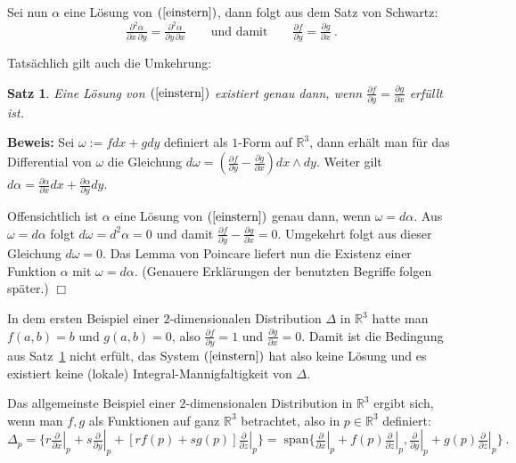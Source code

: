 \documentclass[12pt,a4paper]{article}
\def\R{\mathbb{R}}
\newtheorem{Satz}[Lemma]{Satz}
\def\proof{\noindent\textbf{Beweis:}\quad}
\def\qed{\quad\hfill\ensuremath{\Box}}
\begin{document}
Sei nun $\alpha$ eine L\"osung von $(\ref{einstern})$, dann folgt aus dem Satz von Schwartz:
$$
\tfrac{\partial^2 \alpha}{\partial x \, \partial y}
=
\tfrac{\partial^2 \alpha}{\partial y \, \partial x}
\qquad\mbox{und damit}\qquad
\tfrac{\partial f}{\partial y} = \tfrac{\partial g}{\partial x} \ .
$$

Tats\"achlich gilt auch die Umkehrung:

\begin{Satz}\label{bedingung1}
Eine L\"osung von $(\ref{einstern})$ existiert genau dann, wenn
 $\tfrac{\partial f}{\partial y} = \tfrac{\partial g}{\partial x}$ erf\"ullt ist.
\end{Satz}
\proof
Sei $\omega := f dx + g dy$ definiert als $1$-Form auf $\R^3$, dann erh\"alt man f\"ur das Differential von $\omega$
die Gleichung
$d\omega = (\tfrac{\partial f}{\partial y} - \tfrac{\partial g}{\partial x}) dx \wedge dy$. Weiter gilt
$d\alpha = \tfrac{\partial \alpha}{\partial x}dx + \tfrac{\partial \alpha}{\partial y}dy$.

\medskip

Offensichtlich ist
$\alpha$ eine L\"osung von $(\ref{einstern})$ genau dann, wenn $\omega = d\alpha$. Aus $\omega = d\alpha$ folgt
$d\omega = d^2\alpha = 0$ und damit $\tfrac{\partial f}{\partial y} - \tfrac{\partial g}{\partial x}=0$.
Umgekehrt folgt aus dieser Gleichung $d\omega=0$. Das Lemma von Poincare liefert nun die Existenz einer
Funktion $\alpha$ mit $\omega = d\alpha$.
(Genauere Erkl\"arungen der benutzten Begriffe folgen sp\"ater.)
\qed

\bigskip

In dem ersten Beispiel einer $2$-dimensionalen Distribution $\Delta$ in $\R^3$ hatte man
$f(a,b)=b$ und $g(a,b)=0$, also $\tfrac{\partial f}{\partial y}=1$ und $\tfrac{\partial g}{\partial x}=0$.
Damit ist die Bedingung aus Satz~\ref{bedingung1} nicht erf\"ult, das System $(\ref{einstern})$ hat also keine
L\"osung und es existiert keine (lokale) Integral-Mannigfaltigkeit von $\Delta$.

\bigskip

Das allgemeinste Beispiel einer $2$-dimensionalen Distribution in $\R^3$ ergibt sich, wenn man $f, g$ als Funktionen
 auf ganz $\R^3$ betrachtet, also in $p\in \R^3$ definiert:
$$
\Delta_p
=
\{
r\left. \tfrac{\partial }{\partial x}\right|_p   + s \left. \tfrac{\partial }{\partial y}\right|_p
+ [rf(p) + s g(p)] \left. \tfrac{\partial }{\partial z}\right|_p
\}
= \;
\mathrm{span} \{
\left. \tfrac{\partial }{\partial x}\right|_p  + f(p) \left. \tfrac{\partial }{\partial z}\right|_p,
\left. \tfrac{\partial }{\partial y}\right|_p  + g(p) \left. \tfrac{\partial }{\partial z}\right|_p
\} \ .
$$
\end{document}
